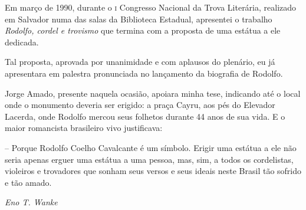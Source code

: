Em março de 1990, durante o \textsc{i} Congresso Nacional da Trova Literária,
realizado em Salvador numa das salas da Biblioteca Estadual, apresentei
o trabalho \textit{Rodolfo, cordel e trovismo} que termina com a
proposta de uma estátua a ele dedicada.

Tal proposta, aprovada por unanimidade e com aplausos do plenário, eu
já apresentara em palestra pronunciada no lançamento da biografia de
Rodolfo.

Jorge Amado, presente naquela ocasião, apoiara minha tese, indicando
até o local onde o monumento deveria ser erigido: a praça Cayru, aos
pés do Elevador Lacerda, onde Rodolfo mercou seus folhetos durante 44
anos de sua vida. E o maior romancista brasileiro vivo justificava:

-- Porque Rodolfo Coelho Cavalcante é um símbolo. Erigir uma estátua
a ele não seria apenas erguer uma estátua a uma pessoa, mas, sim, a		\EP[2]
todos os cordelistas, violeiros e trovadores que sonham seus versos e
seus ideais neste Brasil tão sofrido e tão amado.

\begin{flushright}
\textit{Eno T. Wanke}\\
\end{flushright}


